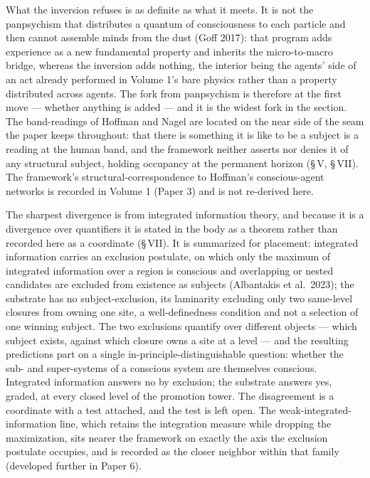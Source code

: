 \documentclass[11pt,oneside]{report}
\theoremstyle{definition}
\theoremstyle{remark}
\begin{document}
What the inversion refuses is as definite as what it meets. It is not the panpsychism that distributes a quantum of consciousness to each particle and then cannot assemble minds from the dust (Goff 2017): that program adds experience as a new fundamental property and inherits the micro-to-macro bridge, whereas the inversion adds nothing, the interior being the agents' side of an act already performed in Volume 1's bare physics rather than a property distributed across agents. The fork from panpsychism is therefore at the first move --- whether anything is added --- and it is the widest fork in the section. The band-readings of Hoffman and Nagel are located on the near side of the seam the paper keeps throughout: that there is something it is like to be a subject is a reading at the human band, and the framework neither asserts nor denies it of any structural subject, holding occupancy at the permanent horizon (\S\,V, \S\,VII). The framework's structural-correspondence to Hoffman's conscious-agent networks is recorded in Volume 1 (Paper 3) and is not re-derived here.

The sharpest divergence is from integrated information theory, and because it is a divergence over quantifiers it is stated in the body as a theorem rather than recorded here as a coordinate (\S\,VII). It is summarized for placement: integrated information carries an exclusion postulate, on which only the maximum of integrated information over a region is conscious and overlapping or nested candidates are excluded from existence as subjects (Albantakis et al.\ 2023); the substrate has no subject-exclusion, its laminarity excluding only two same-level closures from owning one site, a well-definedness condition and not a selection of one winning subject. The two exclusions quantify over different objects --- which subject exists, against which closure owns a site at a level --- and the resulting predictions part on a single in-principle-distinguishable question: whether the sub- and super-systems of a conscious system are themselves conscious. Integrated information answers no by exclusion; the substrate answers yes, graded, at every closed level of the promotion tower. The disagreement is a coordinate with a test attached, and the test is left open. The weak-integrated-information line, which retains the integration measure while dropping the maximization, sits nearer the framework on exactly the axis the exclusion postulate occupies, and is recorded as the closer neighbor within that family (developed further in Paper 6).
\end{document}
